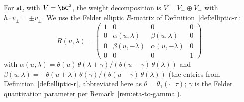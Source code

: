 For $\mathfrak{sl}_2$ with $V = \bC^2$, the weight decomposition
is $V = V_+ \oplus V_-$ with $h \cdot v_\pm = \pm v_\pm$.
We use the Felder elliptic $R$-matrix of Definition~\ref{def:elliptic-r}:
\begin{equation}\label{eq:sl2-r-matrix-entries}
R(u, \lambda) =
\begin{pmatrix}
1 & 0 & 0 & 0 \\
0 & \alpha(u, \lambda) & \beta(u, \lambda) & 0 \\
0 & \beta(u, -\lambda) & \alpha(u, -\lambda) & 0 \\
0 & 0 & 0 & 1
\end{pmatrix}
\end{equation}
with $\alpha(u,\lambda) = \theta(u)\,\theta(\lambda+\gamma)/\allowbreak
(\theta(u-\gamma)\,\theta(\lambda))$ and
$\beta(u,\lambda) = -\theta(u+\lambda)\,\theta(\gamma)/\allowbreak
(\theta(u-\gamma)\,\theta(\lambda))$
(the entries from Definition~\ref{def:elliptic-r},
abbreviated here as $\theta = \theta_1(\cdot\,|\,\tau)$; $\gamma$ is the Felder quantization parameter per Remark~\ref{rem:eta-to-gamma}).

